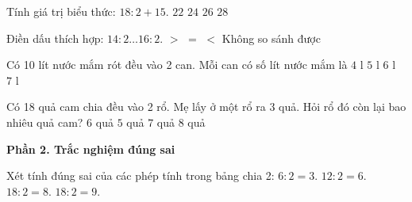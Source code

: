 \begin{ex} %
Tính giá trị biểu thức: $18 : 2 + 15$.
\choice
{$22$}
{\True $24$}
{$26$}
{$28$}
\end{ex}

\begin{ex} %
Điền dấu thích hợp: $14 : 2 \dots 16 : 2$.
\choice
{$>$}
{$=$}
{\True $<$}
{Không so sánh được}
\end{ex}

\begin{ex} %
Có 10 lít nước mắm rót đều vào 2 can. Mỗi can có số lít nước mắm là
\choice
{$4\text{ l}$}
{\True $5\text{ l}$}
{$6\text{ l}$}
{$7\text{ l}$}
\end{ex}

\begin{ex} %
Có 18 quả cam chia đều vào 2 rổ. Mẹ lấy ở một rổ ra 3 quả. Hỏi rổ đó còn lại bao nhiêu quả cam?
\choice
{\True $6$ quả}
{$5$ quả}
{$7$ quả}
{$8$ quả}
\end{ex}

\textbf{Phần 2. Trắc nghiệm đúng sai}

\begin{ex} %
Xét tính đúng sai của các phép tính trong bảng chia 2:
\choiceTF
{\True $6 : 2 = 3$.}
{\True $12 : 2 = 6$.}
{$18 : 2 = 8$.}
{\True $18 : 2 = 9$.}
\end{ex}

